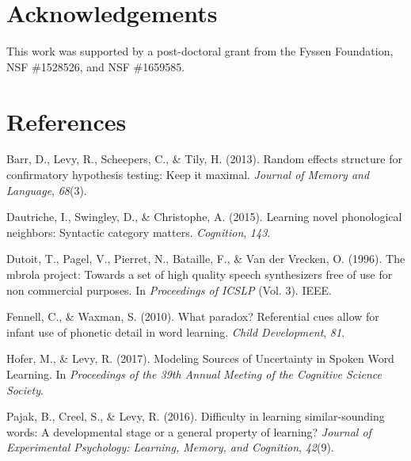 \documentclass[10pt, letterpaper]{article}
\begin{document}
\vspace{1em}

\vspace{1em}

\section{Acknowledgements}\label{acknowledgements}

This work was supported by a post-doctoral grant from the Fyssen
Foundation, NSF \#1528526, and NSF \#1659585.

\section{References}\label{references}

\setlength{\parindent}{-0.1in} \setlength{\leftskip}{0.125in} \noindent

\hypertarget{refs}{}
\hypertarget{ref-barr2013}{}
Barr, D., Levy, R., Scheepers, C., \& Tily, H. (2013). Random effects
structure for confirmatory hypothesis testing: Keep it maximal.
\emph{Journal of Memory and Language}, \emph{68}(3).

\hypertarget{ref-dautriche2015}{}
Dautriche, I., Swingley, D., \& Christophe, A. (2015). Learning novel
phonological neighbors: Syntactic category matters. \emph{Cognition},
\emph{143}.

\hypertarget{ref-dutoit1996}{}
Dutoit, T., Pagel, V., Pierret, N., Bataille, F., \& Van der Vrecken, O.
(1996). The mbrola project: Towards a set of high quality speech
synthesizers free of use for non commercial purposes. In
\emph{Proceedings of ICSLP} (Vol. 3). IEEE.

\hypertarget{ref-fennell2010}{}
Fennell, C., \& Waxman, S. (2010). What paradox? Referential cues allow
for infant use of phonetic detail in word learning. \emph{Child
Development}, \emph{81}.

\hypertarget{ref-hofer2017}{}
Hofer, M., \& Levy, R. (2017). Modeling Sources of Uncertainty in Spoken
Word Learning. In \emph{Proceedings of the 39th Annual Meeting of the
Cognitive Science Society}.

\hypertarget{ref-pajak2016}{}
Pajak, B., Creel, S., \& Levy, R. (2016). Difficulty in learning
similar-sounding words: A developmental stage or a general property of
learning? \emph{Journal of Experimental Psychology: Learning, Memory,
and Cognition}, \emph{42}(9).
\end{document}
